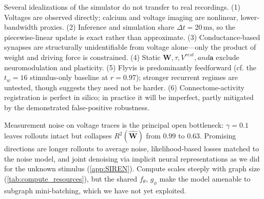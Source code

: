 \documentclass{article}
\begin{document}
{\color{red}%
Several idealizations of the simulator do not transfer to real recordings. (1) Voltages are observed directly; calcium and voltage imaging are nonlinear, lower-bandwidth proxies. (2) Inference and simulation share $\Delta t = 20\,\text{ms}$, so the piecewise-linear update is exact rather than approximate. (3) Conductance-based synapses are structurally unidentifiable from voltage alone---only the product of weight and driving force is constrained. (4) Static $\mathbf{W}, \tau, V^{rest}, and \mathbf{a}$ exclude neuromodulation and plasticity. (5) Flyvis is predominantly feedforward (cf. the $t_w=16$ stimulus-only baseline at $r=0.97$); stronger recurrent regimes are untested, though \citet{allier_graph_2026} suggests they need not be harder. (6) Connectome-activity registration is perfect in silico; in practice it will be imperfect, partly mitigated by the demonstrated false-positive robustness.

Measurement noise on voltage traces is the principal open bottleneck: $\gamma = 0.1$ leaves rollouts intact but collapses $R^2(\hat{\mathbf{W}})$ from $0.99$ to $0.63$. Promising directions are longer rollouts to average noise, likelihood-based losses matched to the noise model, and joint denoising via implicit neural representations as we did for the unknown stimulus (\cref{app:SIREN}). Compute scales steeply with graph size (\cref{tab:compute_resources}), but the shared $f_\theta$, $g_\phi$ make the model amenable to subgraph mini-batching, which we have not yet exploited.


}%
\end{document}
